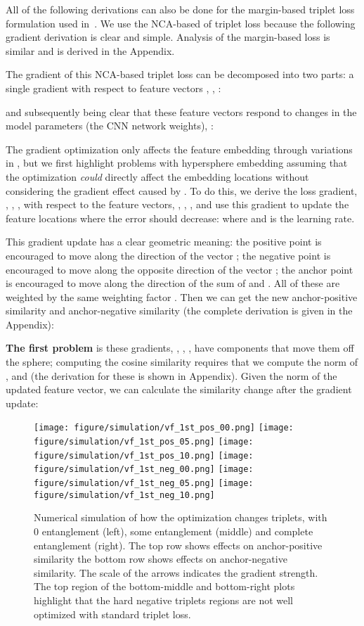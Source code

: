 \documentclass[runningheads]{llncs}
\begin{document}
All of the following derivations can also be done for the margin-based triplet loss formulation used in~\cite{facenet}. We use the NCA-based of triplet loss because the following gradient derivation is clear and simple. Analysis of the margin-based loss is similar and is derived in the Appendix.

The gradient of this NCA-based triplet loss  can be decomposed into two parts: a single gradient with respect to feature vectors , , : 



and subsequently being clear that these feature vectors respond to changes in the model parameters (the CNN network weights), :



The gradient optimization only affects the feature embedding through variations in , but we first highlight problems with hypersphere embedding assuming that the optimization {\em could} directly affect the embedding locations without considering the gradient effect caused by .  To do this, we derive the loss gradient, , , , with respect to the feature vectors, , , , and use this gradient to update the feature locations where the error should decrease:
where  and  is the learning rate.

This gradient update has a clear geometric meaning: the positive point  is encouraged to move along the direction of the vector ; the negative point  is encouraged to move along the opposite direction of the vector ; the anchor point  is encouraged to move along the direction of the sum of  and . All of these are weighted by the same weighting factor . Then we can get the new anchor-positive similarity and anchor-negative similarity (the complete derivation is given in the Appendix):


{\bf The first problem} is these gradients, , , , have components that move them off the sphere; computing the cosine similarity requires that we compute the norm of ,  and  (the derivation for these is shown in Appendix). Given the norm of the updated feature vector, we can calculate the similarity change after the gradient update:


\begin{figure}
  \centering
  \texttt{[image: figure/simulation/vf\_1st\_pos\_00.png]}
  \texttt{[image: figure/simulation/vf\_1st\_pos\_05.png]}
  \texttt{[image: figure/simulation/vf\_1st\_pos\_10.png]}
  \texttt{[image: figure/simulation/vf\_1st\_neg\_00.png]}
  \texttt{[image: figure/simulation/vf\_1st\_neg\_05.png]}
  \texttt{[image: figure/simulation/vf\_1st\_neg\_10.png]}
  \caption{Numerical simulation of how the optimization changes triplets, with 0 entanglement (left), some entanglement (middle) and complete entanglement (right).  The top row shows effects on anchor-positive similarity the bottom row shows effects on anchor-negative similarity.  The scale of the arrows indicates the gradient strength. The top region of the bottom-middle and bottom-right plots highlight that the hard negative triplets regions are not well optimized with standard triplet loss.}
  \label{fig:delta}
\end{figure}
\end{document}
